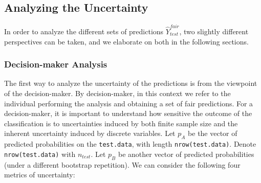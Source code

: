 \documentclass[
  nojss]{jss}
\begin{document}
\hypertarget{analyzing-the-uncertainty}{%
\subsection{Analyzing the Uncertainty}\label{analyzing-the-uncertainty}}

In order to analyze the different sets of predictions
\(\widehat{Y}^{fair}_{test}\), two slightly different perspectives can
be taken, and we elaborate on both in the following sections.

\hypertarget{decision-maker-analysis}{%
\subsubsection{Decision-maker Analysis}\label{decision-maker-analysis}}

The first way to analyze the uncertainty of the predictions is from the
viewpoint of the decision-maker. By decision-maker, in this context we
refer to the individual performing the analysis and obtaining a set of
fair predictions. For a decision-maker, it is important to understand
how sensitive the outcome of the classification is to uncertainties
induced by both finite sample size and the inherent uncertainty induced
by discrete variables. Let \(p_A\) be the vector of predicted
probabilities on the \texttt{test.data}, with length
\texttt{nrow(test.data)}. Denote \texttt{nrow(test.data)} with
\(n_{test}\). Let \(p_B\) be another vector of predicted probabilities
(under a different bootstrap repetition). We can consider the following
four metrics of uncertainty:
\end{document}
